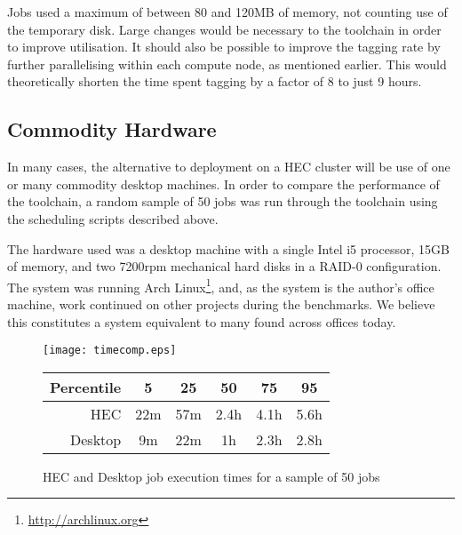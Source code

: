 Jobs used a maximum of between 80 and 120MB of memory, not counting use of the temporary disk.  Large changes would be necessary to the toolchain in order to improve utilisation.  It should also be possible to improve the tagging rate by further parallelising within each compute node, as mentioned earlier.  This would theoretically shorten the time spent tagging by a factor of 8 to just 9 hours.




\subsection{Commodity Hardware}
In many cases, the alternative to deployment on a HEC cluster will be use of one or many commodity desktop machines.  In order to compare the performance of the toolchain, a random sample of 50 jobs was run through the toolchain using the scheduling scripts described above.

The hardware used was a desktop machine with a single Intel i5 processor, 15GB of memory, and two 7200rpm mechanical hard disks in a RAID-0 configuration.  The system was running Arch Linux\footnote{\url{http://archlinux.org}}, and, as the system is the author's office machine, work continued on other projects during the benchmarks.  We believe this constitutes a system equivalent to many found across offices today.

\begin{figure}[h]
    \centering
    \texttt{[image: timecomp.eps]}


    \begin{tabular}{ | r | c | c | c | c | c | }
        \hline
        Percentile & 5 & 25 & 50 & 75 & 95 \\ \hline
        HEC        & 22m & 57m & 2.4h & 4.1h & 5.6h \\ \hline
        Desktop    & 9m & 22m & 1h & 2.3h & 2.8h \\ \hline
    \end{tabular}

    \caption{HEC and Desktop job execution times for a sample of 50 jobs}
    \label{fig:timecomp}
\end{figure}


